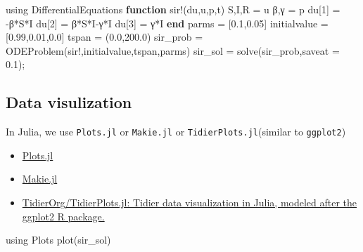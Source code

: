 \documentclass[
  letterpaper,
  DIV=11,
  numbers=noendperiod]{scrreport}
\newenvironment{Shaded}{\begin{snugshade}}{\end{snugshade}}
\newcommand{\BuiltInTok}[1]{\textcolor[rgb]{0.00,0.23,0.31}{#1}}
\newcommand{\FloatTok}[1]{\textcolor[rgb]{0.68,0.00,0.00}{#1}}
\newcommand{\FunctionTok}[1]{\textcolor[rgb]{0.28,0.35,0.67}{#1}}
\newcommand{\ImportTok}[1]{\textcolor[rgb]{0.00,0.46,0.62}{#1}}
\newcommand{\KeywordTok}[1]{\textcolor[rgb]{0.00,0.23,0.31}{\textbf{#1}}}
\newcommand{\NormalTok}[1]{\textcolor[rgb]{0.00,0.23,0.31}{#1}}
\newcommand{\OperatorTok}[1]{\textcolor[rgb]{0.37,0.37,0.37}{#1}}
\begin{document}
\begin{Shaded}
\begin{Highlighting}[]
\ImportTok{using} \BuiltInTok{DifferentialEquations}
\KeywordTok{function} \FunctionTok{sir!}\NormalTok{(du,u,p,t)}
\NormalTok{    S,I,R }\OperatorTok{=}\NormalTok{ u}
\NormalTok{    β,γ }\OperatorTok{=}\NormalTok{ p}
\NormalTok{    du[}\FloatTok{1}\NormalTok{] }\OperatorTok{=} \OperatorTok{{-}}\NormalTok{β}\OperatorTok{*}\NormalTok{S}\OperatorTok{*}\NormalTok{I}
\NormalTok{    du[}\FloatTok{2}\NormalTok{] }\OperatorTok{=}\NormalTok{ β}\OperatorTok{*}\NormalTok{S}\OperatorTok{*}\NormalTok{I}\OperatorTok{{-}}\NormalTok{γ}\OperatorTok{*}\NormalTok{I}
\NormalTok{    du[}\FloatTok{3}\NormalTok{] }\OperatorTok{=}\NormalTok{ γ}\OperatorTok{*}\NormalTok{I}
\KeywordTok{end}
\NormalTok{parms }\OperatorTok{=}\NormalTok{ [}\FloatTok{0.1}\NormalTok{,}\FloatTok{0.05}\NormalTok{]}
\NormalTok{initialvalue }\OperatorTok{=}\NormalTok{ [}\FloatTok{0.99}\NormalTok{,}\FloatTok{0.01}\NormalTok{,}\FloatTok{0.0}\NormalTok{]}
\NormalTok{tspan }\OperatorTok{=}\NormalTok{ (}\FloatTok{0.0}\NormalTok{,}\FloatTok{200.0}\NormalTok{)}
\NormalTok{sir\_prob }\OperatorTok{=} \FunctionTok{ODEProblem}\NormalTok{(sir!,initialvalue,tspan,parms)}
\NormalTok{sir\_sol }\OperatorTok{=} \FunctionTok{solve}\NormalTok{(sir\_prob,saveat }\OperatorTok{=} \FloatTok{0.1}\NormalTok{);}
\end{Highlighting}
\end{Shaded}

\subsection{Data visulization}\label{data-visulization}

In Julia, we use \texttt{Plots.jl} or \texttt{Makie.jl} or
\texttt{TidierPlots.jl}(similar to \texttt{ggplot2})

\begin{itemize}
\item
  \href{https://docs.juliaplots.org/stable/}{Plots.jl}
\item
  \href{https://docs.makie.org/stable/}{Makie.jl}
\item
  \href{https://github.com/TidierOrg/TidierPlots.jl}{TidierOrg/TidierPlots.jl:
  Tidier data visualization in Julia, modeled after the ggplot2 R
  package.}
\end{itemize}

\begin{Shaded}
\begin{Highlighting}[]
\ImportTok{using} \BuiltInTok{Plots}
\FunctionTok{plot}\NormalTok{(sir\_sol)}
\end{Highlighting}
\end{Shaded}
\end{document}
